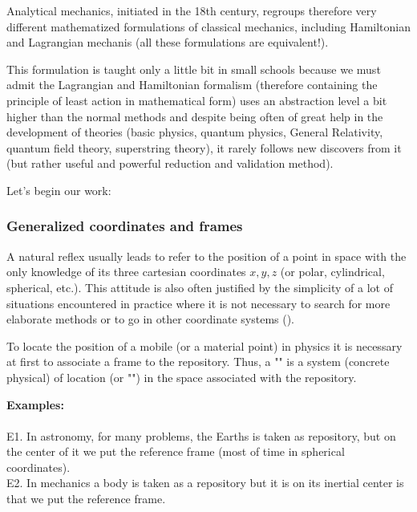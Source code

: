 	Analytical mechanics, initiated in the 18th century, regroups therefore very different mathematized formulations of classical mechanics, including Hamiltonian and Lagrangian mechanis (all these formulations are equivalent!).
	
	This formulation is taught only a little bit in small schools because we must admit the Lagrangian and Hamiltonian formalism (therefore containing the principle of least action in mathematical form) uses an abstraction level a bit higher than the normal methods and despite being often of great help in the development of theories (basic physics, quantum physics, General Relativity, quantum field theory, superstring theory), it rarely follows new discovers from it (but rather useful and powerful reduction and validation method).
	
	Let's begin our work:
	
	\subsubsection{Generalized coordinates and frames}
	A natural reflex usually leads to refer to the position of a point in space with the only knowledge of its three cartesian coordinates $x, y, z$ (or polar, cylindrical, spherical, etc.). This attitude is also often justified by the simplicity of a lot of situations encountered in practice where it is not necessary to search for more elaborate methods or to go in other coordinate systems ().
	
	To locate the position of a mobile (or a material point) in physics it is necessary at first to associate a frame to the repository. Thus, a "" is a system (concrete physical) of location (or "") in the space associated with the repository.
	
	\begin{tcolorbox}[colframe=black,colback=white,sharp corners]
	\textbf{{\Large {}}Examples:}\\\\
	E1. In astronomy, for many problems, the Earths is taken as repository, but on the center of it we put the reference frame (most of time in spherical coordinates).\\
	
	E2. In mechanics a body is taken as a repository but it is on its inertial center is that we put the reference frame.
	\end{tcolorbox}
	
